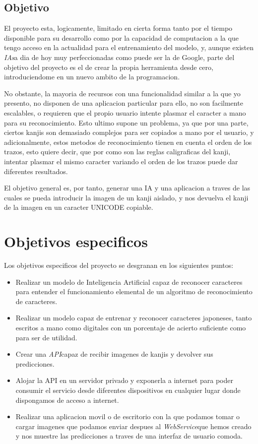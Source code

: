 \documentclass{article}
\begin{document}
\subsection{Objetivo}
El proyecto esta, logicamente, limitado en cierta forma tanto por el tiempo disponible para su desarrollo como por la capacidad de computacion a la que tengo acceso en la actualidad para el entrenamiento del modelo, y, aunque existen \textit{IAs}\rep a dia de hoy muy perfeccionadas como puede ser la de Google, parte del objetivo del proyecto es el de crear la propia herramienta desde cero, introduciendome en un nuevo ambito de la programacion. 

No obstante, la mayoria de recursos con una funcionalidad similar a la que yo presento, no disponen de una aplicacion particular para ello, no son facilmente escalables, o requieren que el propio usuario intente plasmar el caracter a mano para su reconocimiento. Esto ultimo supone un problema, ya que por una parte, ciertos kanjis son demasiado complejos para ser copiados a mano por el usuario, y adicionalmente, estos metodos de reconocimiento tienen en cuenta el orden de los trazos, esto quiere decir, que por como son las reglas caligraficas del kanji, intentar plasmar el mismo caracter variando el orden de los trazos puede dar diferentes resultados.

El objetivo general es, por tanto, generar una IA y una aplicacion a traves de las cuales se pueda introducir la imagen de un kanji aislado, y nos devuelva el kanji de la imagen en un caracter UNICODE copiable.

\newpage

\section{Objetivos especificos}

Los objetivos especificos del proyecto se desgranan en los siguientes puntos:

\begin{itemize}
    \item Realizar un modelo de Inteligencia Artificial capaz de reconocer caracteres para entender el funcionamiento elemental de un algoritmo de reconocimiento de caracteres.
    \item Realizar un modelo capaz de entrenar y reconocer caracteres japoneses, tanto escritos a mano como digitales con un porcentaje de acierto suficiente como para ser de utilidad.
    \item Crear una \textit{API}\rep capaz de recibir imagenes de kanjis y devolver sus predicciones.
    \item Alojar la API en un servidor privado y exponerla a internet para poder consumir el servicio desde diferentes dispositivos en cualquier lugar donde dispongamos de acceso a internet.
    \item Realizar una aplicacion movil o de escritorio con la que podamos tomar o cargar imagenes que podamos enviar despues al \textit{WebService}\rep que hemos creado y nos muestre las predicciones a traves de una interfaz de usuario comoda.
\end{itemize}
\end{document}
